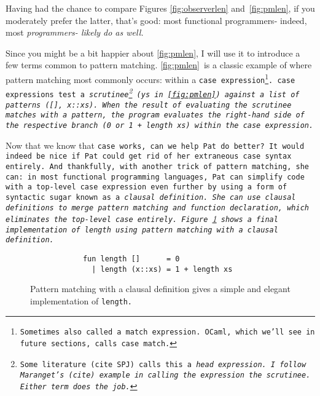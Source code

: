 \documentclass[manuscript,screen,review, 12pt]{acmart}
\begin{document}
    Having had the chance to compare Figures \ref{fig:observerlen}
    and~\ref{fig:pmlen}, if you moderately prefer the latter, that's good: most
    functional programmers- indeed, most \it{programmers}- likely do as well. 

    Since you might be a bit happier about \ref{fig:pmlen}, I will use it to
    introduce a few terms common to pattern matching. \ref{fig:pmlen}~is a
    classic example of where pattern matching most commonly occurs: within a
    \tt{case} expression\footnote{Sometimes also called a \tt{match expression}.
    OCaml, which we'll see in future sections, calls \tt{case} \tt{match}.}.
    \tt{case} expressions test a \it{scrutinee}\footnote{Some literature (cite
    SPJ) calls this a \it{head expression}. I follow Maranget's (cite) example
    in calling the expression the \it{scrutinee}. Either term does the job.}
    (\tt{ys} in~\ref{fig:pmlen}) against a list of patterns (\tt{[]},
    \tt{x::xs}). When the result of evaluating the scrutinee matches with a
    pattern, the program evaluates the right-hand side of the respective branch
    (\tt{0} or \tt{1 + length xs}) within the \tt{case} expression. 

    Now that we know that \tt{case} works, can we help Pat do better? It would
    indeed be nice if Pat could get rid of her extraneous \tt{case} syntax
    entirely. And thankfully, with another trick of pattern matching, she can:
    in most functional programming languages, Pat can simplify code with a
    top-level \tt{case} expression even further by using a form of syntactic
    sugar known as a \it{clausal definition}. She can use clausal definitions to
    merge pattern matching and function declaration, which eliminates the
    top-level \tt{case} entirely. Figure~\ref{fig:pmclausallen} shows a final
    implementation of \tt{length} using pattern matching with a clausal
    definition. 
    
    

    \begin{figure}[ht]
    \smllst
    \begin{verbatim}
            fun length []      = 0
              | length (x::xs) = 1 + length xs
        \end{verbatim}
    \caption{Pattern matching with a clausal definition gives a simple and 
             elegant implementation of \tt{length}.}
    \label{fig:pmclausallen}
    \end{figure}
    
\end{document}
